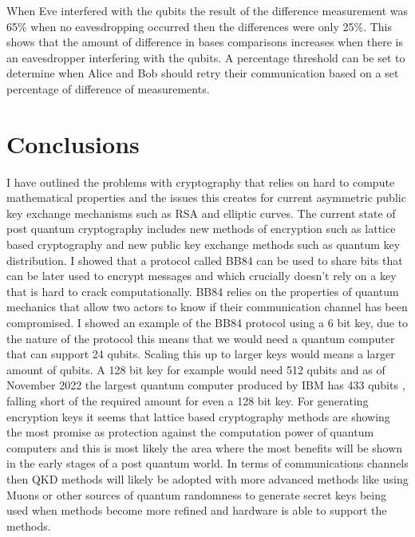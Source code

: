 \documentclass{article}
\begin{document}
\vspace{5mm}

When Eve interfered with the qubits the result of the difference measurement was 65\% when no eavesdropping occurred then the differences were only 25\%. This shows that the amount of difference in bases comparisons increases when there is an eavesdropper interfering with the qubits. A percentage threshold can be set to determine when Alice and Bob should retry their communication based on a set percentage of difference of measurements.

\section{Conclusions}

I have outlined the problems with cryptography that relies on hard to compute mathematical properties and the issues this creates for current asymmetric public key exchange mechanisms such as RSA and elliptic curves. The current state of post quantum cryptography includes new methods of encryption such as lattice based cryptography and new public key exchange methods such as quantum key distribution. I showed that a protocol called BB84 can be used to share bits that can be later used to encrypt messages and which crucially doesn't rely on a key that is hard to crack computationally. BB84 relies on the properties of quantum mechanics that allow two actors to know if their communication channel has been compromised. I showed an example of the BB84 protocol using a 6 bit key, due to the nature of the protocol this means that we would need a quantum computer that can support 24 qubits. Scaling this up to larger keys would means a larger amount of qubits. A 128 bit key for example would need 512 qubits and as of November 2022 the largest quantum computer produced by IBM has 433 qubits \cite{2022IBMScientist}, falling short of the required amount for even a 128 bit key.
For generating encryption keys it seems that lattice based cryptography methods are showing the most promise as protection against the computation power of quantum computers and this is most likely the area where the most benefits will be shown in the early stages of a post quantum world. 
In terms of communications channels then QKD methods will likely be adopted with more advanced methods like using Muons or other sources of quantum randomness to generate secret keys being used when methods become more refined and hardware is able to support the methods.

\printbibliography
\end{document}
